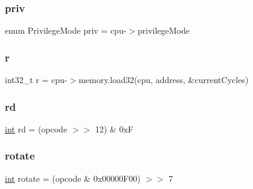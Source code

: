 \mbox{\label{isa-arm_8c_a0aeea5daab02e6ee74a9948da77a56e5}} 
\subsubsection{\texorpdfstring{priv}{priv}}
{\footnotesize\ttfamily enum Privilege\+Mode priv = cpu-\/$>$privilege\+Mode}

\mbox{\label{isa-arm_8c_ad0156306be8fa0a12414e0da384f986a}} 
\subsubsection{\texorpdfstring{r}{r}}
{\footnotesize\ttfamily int32\+\_\+t r = cpu-\/$>$memory.\+load32(cpu, address, \&current\+Cycles)}

\mbox{\label{isa-arm_8c_a555541ce18ed9b5fad657a06b22cb465}} 
\subsubsection{\texorpdfstring{rd}{rd}}
{\footnotesize\ttfamily \mbox{\hyperlink{ioapi_8h_a787fa3cf048117ba7123753c1e74fcd6}{int}} rd = (opcode $>$$>$ 12) \& 0xF}

\mbox{\label{isa-arm_8c_a0b95db0f87fcbe71c3bbda1fa359606f}} 
\subsubsection{\texorpdfstring{rotate}{rotate}}
{\footnotesize\ttfamily \mbox{\hyperlink{ioapi_8h_a787fa3cf048117ba7123753c1e74fcd6}{int}} rotate = (opcode \& 0x00000\+F00) $>$$>$ 7}

